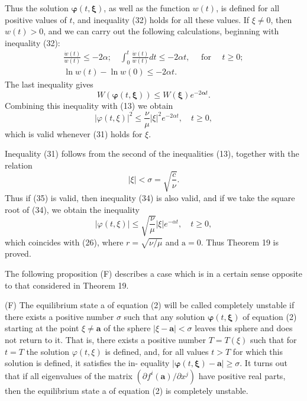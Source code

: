 \documentclass[10pt,a5paper]{book}
\makeatletter
\theoremstyle{plain}
\theoremstyle{definition}
\theoremstyle{remark}
\renewenvironment{proof}[1][\proofname]{\par
  \pushQED{\qed}%
  \normalfont\topsep6\p@\@plus6\p@\relax
  \trivlist
  \item\relax{\itshape #1\@addpunct{.}}\hspace\labelsep\ignorespaces
}{\popQED\endtrivlist\@endpefalse}
\makeatother
\begin{document}
\begin{proof}
Thus the solution $\boldsymbol{\varphi}(t, \boldsymbol{\xi})$, as well as the function $w(t)$, is defined for all positive values of $t$, and inequality (32) holds for all these values. If $\xi \neq 0$, then $w(t)>0$, and we can carry out the following calculations, beginning with inequality (32):
\[
\begin{gathered}
\frac{\dot{w}(t)}{w(t)} \leq-2 \alpha ; \quad \int_{0}^{t} \frac{\dot{w}(t)}{w(t)} d t \leq-2 \alpha t, \quad \text { for } \quad t \geq 0 ; \\
\ln w(t)-\ln w(0) \leq-2 \alpha t .
\end{gathered}
\]
The last inequality gives
\[
W(\boldsymbol{\varphi}(t, \boldsymbol{\xi})) \leq W(\boldsymbol{\xi}) e^{-2 \boldsymbol{\alpha} t} .
\]
Combining this inequality with (13) we obtain
\begin{equation*}
|\varphi(t, \xi)|^{2} \leq \frac{\nu}{\mu}|\xi|^{2} e^{-2 \alpha t}, \quad t \geq 0, \tag{34}
\end{equation*}
which is valid whenever (31) holds for $\xi$.

Inequality (31) follows from the second of the inequalities (13), together with the relation
\begin{equation*}
|\xi|<\sigma=\sqrt{\frac{c}{\nu}} . \tag{35}
\end{equation*}
Thus if (35) is valid, then inequality (34) is also valid, and if we take the square root of (34), we obtain the inequality
\[
|\varphi(t, \xi)| \leq \sqrt{\frac{\nu}{\mu}}|\xi| e^{-\alpha t}, \quad t \geq 0,
\]
which coincides with (26), where $r=\sqrt{\nu / \mu}$ and $\mathrm{a}=0$. Thus Theorem 19 is proved.
\end{proof}

The following proposition (F) describes a case which is in a certain sense opposite to that considered in Theorem 19.

(F) The equilibrium state a of equation (2) will be called completely unstable if there exists a positive number $\sigma$ such that any solution $\boldsymbol{\varphi}(t, \boldsymbol{\xi})$ of equation (2) starting at the point $\xi \neq \mathbf{a}$ of the sphere $|\xi-\mathbf{a}|<\sigma$ leaves this sphere and does not return to it. That is, there exists a positive number $T=T(\xi)$ such that for $t=T$ the solution $\varphi(t, \xi)$ is defined, and, for all values $t>T$ for which this solution is defined, it satisfies the in-
equality $|\boldsymbol{\varphi}(t, \boldsymbol{\xi})-\mathbf{a}| \geq \sigma$. It turns out that if all eigenvalues of the matrix $\left(\partial f^{i}(\mathbf{a}) / \partial x^{j}\right)$ have positive real parts, then the equilibrium state a of equation (2) is completely unstable.
\end{document}
